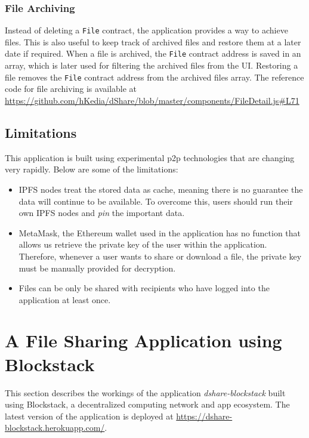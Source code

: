 \subsubsection{File Archiving}
Instead of deleting a \texttt{File} contract, the application provides a way to achieve files. This is also useful to keep track of archived files and restore them at a later date if required. When a file is archived, the \texttt{File} contract address is saved in an array, which is later used for filtering the archived files from the UI. Restoring a file removes the \texttt{File} contract address from the archived files array. The reference code for file archiving is available at \url{https://github.com/hKedia/dShare/blob/master/components/FileDetail.js#L71}

\subsection{Limitations}
This application is built using experimental p2p technologies that are changing very rapidly. Below are some of the limitations:

\begin{itemize}
	\item IPFS nodes treat the stored data as cache, meaning there is no guarantee the data will continue to be available. To overcome this, users should run their own IPFS nodes and \textit{pin}\cite{web:ipfs:pin:1} the important data.
	
	\item MetaMask, the Ethereum wallet used in the application has no function that allows us retrieve the private key of the user within the application. Therefore, whenever a user wants to share or download a file, the private key must be manually provided for decryption.
	
	\item Files can be only be shared with recipients who have logged into the application at least once.
\end{itemize}

\section{A File Sharing Application using Blockstack}
This section describes the workings of the application \textit{dshare-blockstack}\cite{harsh_kedia_2019_3359854} built using Blockstack\cite{blockstack2019whitepaper}, a decentralized computing network and app ecosystem. The latest version of the application is deployed at \url{https://dshare-blockstack.herokuapp.com/}.

